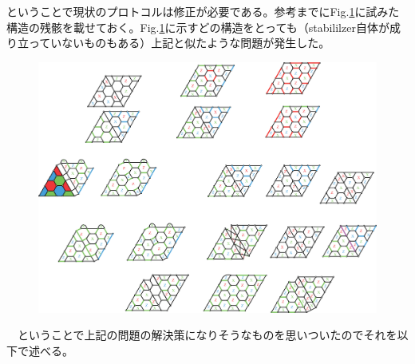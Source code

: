 \documentclass[a4paper,10pt]{ltjsarticle}
\begin{document}
{    ということで現状のプロトコルは修正が必要である。参考までにFig.\ref{figure5}に試みた構造の残骸を載せておく。Fig.\ref{figure5}に示すどの構造をとっても（stabililzer自体が成り立っていないものもある）上記と似たような問題が発生した。

    \begin{figure}[h]
        \centering
        \includegraphics[scale=0.5]{figure/figure5.eps}
        \caption{ }
        \label{figure5}
    \end{figure}
}
\clearpage
　ということで上記の問題の解決策になりそうなものを思いついたのでそれを以下で述べる。
\end{document}
